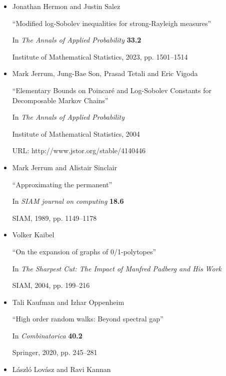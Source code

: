 \documentclass[10pt,a4paper]{article}
\begin{document}
\begin{itemize}
“Catalan Numbers, Their Generalization, and Their Uses”

In \emph{The Mathematical Intelligencer} \textbf{13}, 1991, pp. 64–75


      

\item[] [HS23]
Jonathan Hermon and Justin Salez

“Modified log-Sobolev inequalities for strong-Rayleigh measures”

In \emph{The Annals of Applied Probability} \textbf{33.2}

Institute of Mathematical Statistics, 2023, pp. 1501–1514


      

\item[] [Jer+04]
Mark Jerrum, Jung-Bae Son, Prasad Tetali and Eric Vigoda

“Elementary Bounds on Poincaré and Log-Sobolev Constants for Decomposable Markov Chains”

In \emph{The Annals of Applied Probability}

Institute of Mathematical Statistics, 2004

URL: http://www.jstor.org/stable/4140446


      

\item[] [JS89]
Mark Jerrum and Alistair Sinclair

“Approximating the permanent”

In \emph{SIAM journal on computing} \textbf{18.6}

SIAM, 1989, pp. 1149–1178


      

\item[] [Kai04]
Volker Kaibel

“On the expansion of graphs of 0/1-polytopes”

In \emph{The Sharpest Cut: The Impact of Manfred Padberg and His Work}

SIAM, 2004, pp. 199–216


      

\item[] [KO20]
Tali Kaufman and Izhar Oppenheim

“High order random walks: Beyond spectral gap”

In \emph{Combinatorica} \textbf{40.2}

Springer, 2020, pp. 245–281


      

\item[] [LK99]
László Lovász and Ravi Kannan


\end{itemize}
\end{document}

